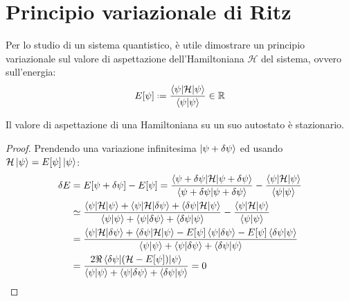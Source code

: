 
\section{Principio variazionale di Ritz}

Per lo studio di un sistema quantistico, è utile dimostrare un principio variazionale sul valore di aspettazione dell'Hamiltoniana $ \mathcal{H} $ del sistema, ovvero sull'energia:
\begin{equation}
	E[\psi] \defeq \frac{\braket{\psi | \mathcal{H} | \psi}}{\braket{\psi | \psi}} \in \R
\end{equation}

\begin{proposition}{}{}
	Il valore di aspettazione di una Hamiltoniana su un suo autostato è stazionario.

	\tcblower

	\begin{proof}
		Prendendo una variazione infinitesima $ \ket{\psi + \delta\psi} $ ed usando $ \mathcal{H} \ket{\psi} = E[\psi] \ket{\psi} $:
		\begin{equation*}
			\begin{split}
				\delta E
				&= E[\psi + \delta\psi] - E[\psi] = \frac{\braket{\psi + \delta\psi | \mathcal{H} | \psi + \delta\psi}}{\braket{\psi + \delta\psi | \psi + \delta\psi}} - \frac{\braket{\psi | \mathcal{H} | \psi}}{\braket{\psi | \psi}} \\
				&\simeq \frac{\braket{\psi | \mathcal{H} | \psi} + \braket{\psi | \mathcal{H} | \delta\psi} + \braket{\delta\psi | \mathcal{H} | \psi}}{\braket{\psi | \psi} + \braket{\psi | \delta\psi} + \braket{\delta\psi | \psi}} - \frac{\braket{\psi | \mathcal{H} | \psi}}{\braket{\psi | \psi}} \\
				&= \frac{\braket{\psi | \mathcal{H} | \delta\psi} + \braket{\delta\psi | \mathcal{H} | \psi} - E[\psi] \braket{\psi | \delta\psi} - E[\psi] \braket{\delta\psi | \psi}}{\braket{\psi | \psi} + \braket{\psi | \delta\psi} + \braket{\delta\psi | \psi}} \\
				&= \frac{2\Re \braket{\delta\psi | (\mathcal{H} - E[\psi]) | \psi}}{\braket{\psi | \psi} + \braket{\psi | \delta\psi} + \braket{\delta\psi | \psi}} = 0
			\end{split}
		\end{equation*}
	\end{proof}
\end{proposition}

